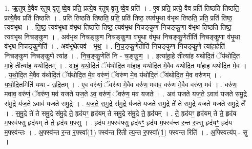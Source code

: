 \documentclass[17pt]{extarticle}
\begin{document}
1. ऋ॒तुष् वे॒वैव र्‌तुष् वृ॒तु ष्वे॒व प्रति॒ प्रत्ये॒व र्‌तुष् वृ॒तु ष्वे॒व प्रति॑ । . ए॒व प्रति॒ प्रत्ये॒ वैव प्रति॑ तिष्ठति तिष्ठति॒ प्रत्ये॒वैव प्रति॑ तिष्ठति । . प्रति॑ तिष्ठति तिष्ठति॒ प्रति॒ प्रति॑ तिष्ठ॒ त्यव॑भृ॒था व॑भृथ तिष्ठति॒ प्रति॒ प्रति॑ तिष्ठ॒ त्यव॑भृथ । . ति॒ष्ठ॒ त्यव॑भृ॒था व॑भृथ तिष्ठति तिष्ठ॒ त्यव॑भृथ निचङ्कुण निचङ्कु॒णा व॑भृथ तिष्ठति तिष्ठ॒ त्यव॑भृथ निचङ्कुण । . अव॑भृथ निचङ्कुण निचङ्कु॒णा व॑भृ॒था व॑भृथ निचङ्कु॒णेतीति॑ निचङ्कु॒णा व॑भृ॒था व॑भृथ निचङ्कु॒णेति॑ । . अव॑भृ॒थेत्यव॑ - भृ॒थ॒ । . नि॒च॒ङ्कु॒णेतीति॑ निचङ्कुण निचङ्कु॒णे त्या॑हा॒हेति॑ निचङ्कुण निचङ्कु॒णे त्या॑ह । . नि॒च॒ङ्कु॒णेति॑ नि - च॒ङ्कु॒ण॒ । . इत्या॑हा॒हे तीत्या॑ह यथोदि॒तं ॅय॑थोदि॒त मा॒हे तीत्या॑ह यथोदि॒तम् । . आ॒ह॒ य॒थो॒दि॒तं ॅय॑थोदि॒त मा॑हाह यथोदि॒त मे॒वैव य॑थोदि॒त मा॑हाह यथोदि॒त मे॒व । . य॒थो॒दि॒त मे॒वैव य॑थोदि॒तं ॅय॑थोदि॒त मे॒व वरु॑णं॒ ॅवरु॑ण मे॒व य॑थोदि॒तं ॅय॑थोदि॒त मे॒व वरु॑णम् । . य॒थो॒दि॒तमिति॑ यथा - उ॒दि॒तम् । . ए॒व वरु॑णं॒ ॅवरु॑ण मे॒वैव वरु॑ण॒ मवाव॒ वरु॑ण मे॒वैव वरु॑ण॒ मव॑ । . वरु॑ण॒ मवाव॒ वरु॑णं॒ ॅवरु॑ण॒ मव॑ यजते यज॒ते ऽव॒ वरु॑णं॒ ॅवरु॑ण॒ मव॑ यजते । . अव॑ यजते यज॒ते ऽवाव॑ यजते समु॒द्रे स॑मु॒द्रे य॑ज॒ते ऽवाव॑ यजते समु॒द्रे । . य॒ज॒ते॒ स॒मु॒द्रे स॑मु॒द्रे य॑जते यजते समु॒द्रे ते॑ ते समु॒द्रे य॑जते यजते समु॒द्रे ते᳚ । . स॒मु॒द्रे ते॑ ते समु॒द्रे स॑मु॒द्रे ते॒ हृद॑यꣳ॒॒ हृद॑यम् ते समु॒द्रे स॑मु॒द्रे ते॒ हृद॑यम् । . ते॒ हृद॑यꣳ॒॒ हृद॑यम् ते ते॒ हृद॑य म॒फ्स्व॑फ्सु हृद॑यम् ते ते॒ हृद॑य म॒फ्सु । . हृद॑य म॒फ्स्व॑फ्सु हृद॑यꣳ॒॒ हृद॑य म॒फ्स्व॑न्त र॒न्त र॒फ्सु हृद॑यꣳ॒॒ हृद॑य म॒फ्स्व॑न्तः । . अ॒फ्स्व॑न्त र॒न्त र॒फ्स्वा᳚(1॒) फ्स्व॑न्त रिती त्य॒न्त र॒फ्स्वा᳚(1॒) फ्स्व॑न्त रिति॑ । . अ॒फ्स्वित्य॑प् - सु । \newline
\end{document}
